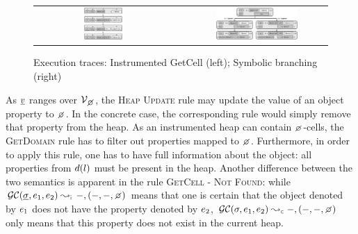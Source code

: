  
\setcounter{figure}{4}   
\begin{figure}[!t]
\centering
\begin{tabular}{c||c}
\includegraphics[width=0.28\textwidth]{figures/domaintable.png} \ & \ \includegraphics[width=0.59\textwidth]{figures/symbSemEx.png}
\end{tabular}
\vspace*{-0.3cm}
\caption{Execution traces: Instrumented GetCell (left); Symbolic branching (right)}
\label{fig:sexecexample}
\vspace*{-0.4cm}
\end{figure}


As $\underline{v}$ ranges over $\setext{\vals}{\none}$, the \textsc{Heap Update} rule may update the value of an object property to $\none$.  
In the concrete case, the corresponding rule would simply remove that property from the heap.  
 As an instrumented heap can contain $\none$-cells, the \textsc{GetDomain} rule has to filter out properties mapped to $\none$. 
 Furthermore, in order to apply this rule, one has to have full information about the object: all properties from $d(l)$ must be present in the heap. 
%
Another difference between the two semantics is apparent in the rule \textsc{GetCell - Not Found}: while $\absgetcellrule{\instrumented}{\istate, \jsilexpr_1, \jsilexpr_2}{-, (-, -, \none)}$ 
means that one is certain that the object denoted by $e_1$ does not have the property 
denoted by $e_2$, $\absgetcellrule{\concrete}{\jstate, \jsilexpr_1, \jsilexpr_2}{-, (-, -, \none)}$ 
only means that this property does not exist in the current heap. %
%


